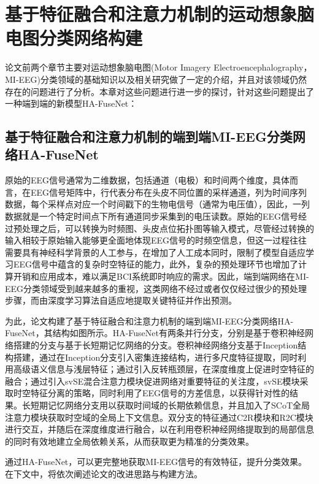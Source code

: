 
\chapter{基于特征融合和注意力机制的运动想象脑电图分类网络构建}

论文前两个章节主要对运动想象脑电图(Motor Imagery Electroencephalography，MI-EEG)分类领域的基础知识以及相关研究做了一定的介绍，并且对该领域仍然存在的问题进行了分析。本章对这些问题进行进一步的探讨，针对这些问题提出了一种端到端的新模型HA-FuseNet：

\section{基于特征融合和注意力机制的端到端MI-EEG分类网络HA-FuseNet}

原始的EEG信号通常为二维数据，包括通道（电极）和时间两个维度，具体而言，在EEG信号矩阵中，行代表分布在头皮不同位置的采样通道，列为时间序列数据，每个采样点对应一个时间戳下的生物电信号（通常为电压值），因此，一列数据就是一个特定时间点下所有通道同步采集到的电压读数。原始的EEG信号经过预处理之后，可以转换为时频图、头皮点位拓扑图等输入模式，尽管经过转换的输入相较于原始输入能够更全面地体现EEG信号的时频空信息，但这一过程往往需要具有神经科学背景的人工参与，在增加了人工成本同时，限制了模型自适应学习EEG信号中蕴含的复杂时空特征的能力，此外，复杂的预处理环节也增加了计算开销和应用成本，难以满足BCI系统即时响应的需求。因此，端到端网络在MI-EEG分类领域受到越来越多的重视，这类网络不经过或者仅仅经过很少的预处理步骤，而由深度学习算法自适应地提取关键特征并作出预测。

为此，论文构建了基于特征融合和注意力机制的端到端MI-EEG分类网络HA-FuseNet，其结构如图所示。HA-FuseNet有两条并行分支，分别是基于卷积神经网络搭建的分支与基于长短期记忆网络的分支。卷积神经网络分支基于Inception结构搭建，通过在Inception分支引入密集连接结构，进行多尺度特征提取，同时利用高级语义信息与浅层特征；通过引入反转瓶颈层，在深度维度上促进时空特征的融合；通过引入svSE混合注意力模块促进网络对重要特征的关注度，svSE模块采取时空特征分离的策略，同时利用了EEG信号的方差信息，以获得针对性的结果。长短期记忆网络分支用以获取时间域的长期依赖信息，并且加入了SCoT全局注意力模块获取时空域的全局上下文信息。双分支的特征通过C2R模块和R2C模块进行交互，并随后在深度维度进行融合，以在利用卷积神经网络提取到的局部信息的同时有效地建立全局依赖关系，从而获取更为精准的分类效果。

通过HA-FuseNet，可以更完整地获取MI-EEG信号的有效特征，提升分类效果。在下文中，将依次阐述论文的改进思路与构建方法。

